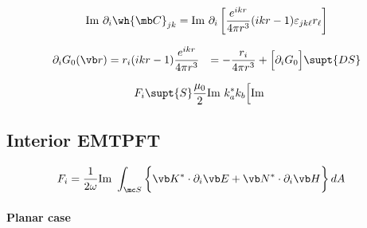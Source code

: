 \begin{align*}
 \text{Im } \partial_i \wh{\mb C}_{jk}
&= \text{Im }
   \partial_i\left[ \frac{e^{ikr}}{4\pi r^3}(ikr-1)\varepsilon_{jk\ell}r_\ell\right]
\\
\end{align*}

\begin{align*}
\partial_i G_0(\vb r)
   &= r_i(ikr-1)\frac{e^{ikr}}{4\pi r^3}
   &= -\frac{r_i}{4\pi r^3} + \Big[\partial_i G_0\Big]\supt{DS}
\end{align*}

\begin{align*}
 F_i\supt{S}
 &\frac{\mu_0}{2} \text{Im }{k_a^* k_b}\Big[\text{Im }
\end{align*}

\subsection{Interior EMTPFT}

\begin{align*}
F_i&=
 \frac{1}{2\omega}\text{Im } 
 \int_{\mc S}\bigg\{ \vb K^* \cdot \partial_i \vb E
                    +\vb N^* \cdot \partial_i \vb H
             \bigg\}\, dA
\end{align*}

\paragraph{Planar case}


